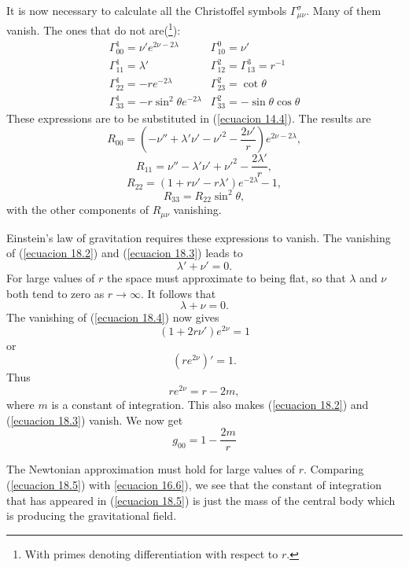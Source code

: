 It is now necessary to calculate all the Christoffel symbols $\Gamma^\sigma_{\mu\nu}$. Many of them vanish. The ones 
that do not are(\footnote{With primes denoting differentiation with respect to $r$.}):
\[
 \begin{array}{ll}
   \Gamma^1_{00} = \nu' e^{2\nu - 2 \lambda}       & \Gamma^0_{10} =  \nu' \\
   \Gamma^1_{11} = \lambda'                        & \Gamma^2_{12} = \Gamma^3_{13} = r^{-1}\\
   \Gamma^1_{22} = - r e^{-2\lambda}               & \Gamma^2_{23} = \cot \theta \\
   \Gamma^1_{33} = - r \sin^2 \theta e^{-2\lambda} & \Gamma^2_{33} = - \sin \theta \cos \theta
 \end{array}
\]
These expressions are to be substituted in (\ref{ecuacion 14.4}). The results are
\begin{equation}
 \label{ecuacion 18.2}
 R_{00} = \left( - \nu'' + \lambda' \nu' - {\nu'}^2 - \frac{2 \nu'}{r} \right) e^{2 \nu - 2 \lambda},
\end{equation}
\begin{equation}
 \label{ecuacion 18.3}
 R_{11} = \nu'' - \lambda' \nu' + {\nu'}^2 - \frac{2 \lambda'}{r},
\end{equation}
\begin{equation}
 \label{ecuacion 18.4}
 R_{22} = (1 + r \nu' - r \lambda' ) e^{-2\lambda} -1,
\end{equation}
\[
 R_{33} = R_{22} \sin^2 \theta,
\]
with the other components of $R_{\mu\nu}$ vanishing.

Einstein's law of gravitation requires these expressions to vanish. The vanishing of (\ref{ecuacion 18.2}) and 
(\ref{ecuacion 18.3}) leads to
\[
 \lambda' + \nu' = 0. 
\]
For large values of $r$ the space must approximate to being flat, so that $\lambda$ and $\nu$ both tend to zero as 
$r\rightarrow \infty$. It follows that
\[
 \lambda + \nu = 0.
\]
The vanishing of (\ref{ecuacion 18.4}) now gives
\[
 (1 + 2 r \nu') e^{2\nu} = 1
\]
or
\[
 \left( r e^{2\nu}\right)' = 1.
\]
Thus 
\[
 r e^{2\nu} = r - 2m,
\]
where $m$ is a constant of integration. This also makes (\ref{ecuacion 18.2}) and (\ref{ecuacion 18.3}) vanish. We now 
get
\begin{equation}
 \label{ecuacion 18.5}
 g_{00} = 1 - \frac{2 m}{r}
\end{equation}

The Newtonian approximation must hold for large values of $r$. Comparing (\ref{ecuacion 18.5}) with \ref{ecuacion 
16.6}), we see that the constant of integration that has appeared in (\ref{ecuacion 18.5}) is just the mass of the 
central body which is producing the gravitational field.

